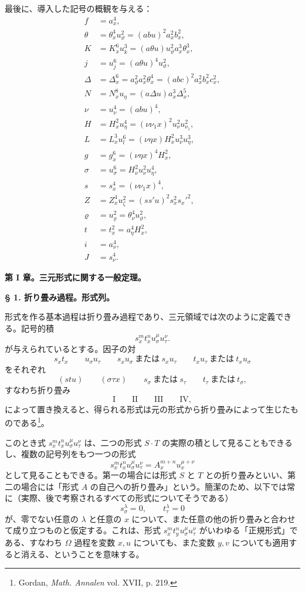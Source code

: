 \documentclass[11pt]{article}
\begin{document}
最後に、導入した記号の概観を与える：
\begin{align*}
f&=a_x^4,\\
\theta&=\theta_x^4u_\vartheta^2=(abu)^2a_x^2b_x^2,\\
K&=K_x^6u_k^3=(a\theta u)u_\vartheta^2a_x^3\theta_x^3,\\
j&=u_j^6=(a\theta u)^4u_\vartheta^2,\\
\Delta&=\Delta_x^6=a_\vartheta^2a_x^2\theta_x^4=(abc)^2a_x^2b_x^2c_x^2,\\
N&=N_x^8u_\eta=(a\Delta u)a_x^3\Delta_x^5,\\
\nu&=u_\nu^4=(abu)^4,\\
H&=H_x^2u_\eta^4=(\nu\nu_1x)^2u_\nu^2u_{\nu_1}^2,\\
L&=L_x^3u_l^6=(\nu\eta x)H_x^2u_\nu^3u_\eta^3,\\
g&=g_x^6=(\nu\eta x)^4H_x^2,\\
\sigma&=u_\sigma^6=H_\nu^2u_\nu^2u_\eta^4,\\
s&=s_x^4=(\nu\nu_1x)^4,\\
Z&=Z_x^4u_\zeta^2=(ss'u)^2s_x^2s_x'^2,\\
\varrho&=u_\varrho^2=\theta_\nu^4u_\vartheta^2,\\
t&=t_x^2=a_\eta^4H_x^2,\\
i&=a_\nu^4,\\
J&=s_\nu^4.
\end{align*}

\begin{center}
{\Large\bfseries 第 I 章。\quad 三元形式に関する一般定理。}
\end{center}

\begin{center}
\textbf{§ 1. \quad 折り畳み過程。\quad 形式列。}
\end{center}

形式を作る基本過程は折り畳み過程であり、三元領域では次のように定義できる。記号的積
\[
s_x^m t_x^n u_\sigma^\mu u_\tau^\nu .
\]
が与えられているとする。因子の対
\[
s_xt_x\qquad u_\sigma u_\tau\qquad s_xu_\sigma\ \text{または}\ s_xu_\tau
\qquad t_xu_\tau\ \text{または}\ t_xu_\sigma
\]
をそれぞれ
\[
(stu)\qquad (\sigma\tau x)\qquad s_\sigma\ \text{または}\ s_\tau
\qquad t_\tau\ \text{または}\ t_\sigma,
\]
すなわち折り畳み
\[
\text{I}\qquad\text{II}\qquad\text{III}\qquad\text{IV},
\]
によって置き換えると、得られる形式は元の形式から折り畳みによって生じたものである\footnote{Gordan, \emph{Math. Annalen} vol. XVII, p. 219.}。

このとき式 $s_x^m t_x^n u_\sigma^\mu u_\tau^\nu$ は、二つの形式 $S\cdot T$ の実際の積として見ることもできるし、複数の記号列をもつ一つの形式
\[
s_x^m t_x^n u_\sigma^\mu u_\tau^\nu=A_x^{m+n}u_x^{\mu+\nu}
\]
として見ることもできる。第一の場合には形式 $S$ と $T$ との折り畳みといい、第二の場合には「形式 $A$ の自己への折り畳み」という。簡潔のため、以下では常に（実際、後で考察されるすべての形式についてそうである）
\[
\tag{a}
s_\sigma^\lambda=0,\qquad t_\tau^\lambda=0
\]
が、零でない任意の $\lambda$ と任意の $x$ について、また任意の他の折り畳みと合わせて成り立つものと仮定する。これは、形式 $s_x^m t_y^n u_\sigma^\mu u_\tau^\nu$ がいわゆる「正規形式」である、すなわち $\Omega$ 過程を変数 $x,u$ についても、また変数 $y,v$ についても適用すると消える、ということを意味する。
\end{document}
